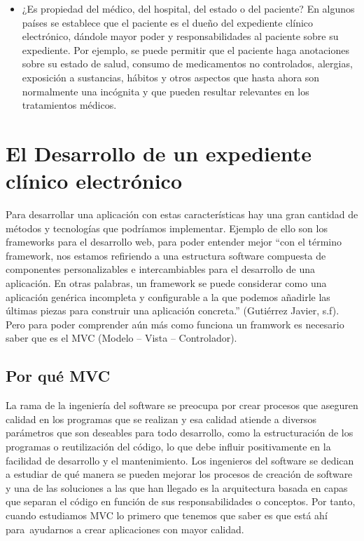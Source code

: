 \begin{itemize}
  \item ¿Es propiedad del médico, del hospital, del estado o del paciente? En algunos países se establece que el paciente es el dueño del expediente clínico electrónico, dándole mayor poder y responsabilidades al paciente sobre su expediente. Por ejemplo, se puede permitir que el paciente haga anotaciones sobre su estado de salud, consumo de medicamentos no controlados, alergias, exposición a sustancias, hábitos y otros aspectos que hasta ahora son normalmente una incógnita y que pueden resultar relevantes en los tratamientos médicos. \cite{marco2}

\end{itemize}

\section{El Desarrollo de un expediente clínico electrónico}

 Para desarrollar una aplicación con estas características hay una gran cantidad de métodos y tecnologías que podríamos implementar. Ejemplo de ello son los frameworks para el desarrollo web, para poder entender mejor “con el término framework, nos estamos refiriendo a una estructura software compuesta de componentes personalizables e intercambiables para el desarrollo de una aplicación. En otras palabras, un framework se puede considerar como una aplicación genérica incompleta y configurable a la que podemos añadirle las últimas piezas para construir una aplicación concreta.” (Gutiérrez Javier, s.f).
Pero para poder comprender aún más como funciona un framwork es necesario saber que es el MVC (Modelo – Vista – Controlador).

\subsection{Por qué MVC}

La rama de la ingeniería del software se preocupa por crear procesos que aseguren calidad en los programas que se realizan y esa calidad atiende a diversos parámetros que son deseables para todo desarrollo, como la estructuración de los programas o reutilización del código, lo que debe influir positivamente en la facilidad de desarrollo y el mantenimiento.
Los ingenieros del software se dedican a estudiar de qué manera se pueden mejorar los procesos de creación de software y una de las soluciones a las que han llegado es la arquitectura basada en capas que separan el código en función de sus responsabilidades o conceptos. Por tanto, cuando estudiamos MVC lo primero que tenemos que saber es que está ahí para ayudarnos a crear aplicaciones con mayor calidad. \cite{marco3}

